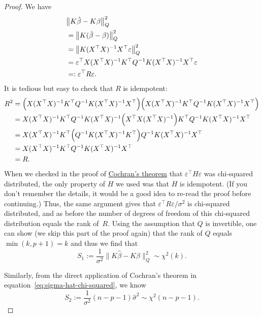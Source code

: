 \documentclass[
  a4paper,
]{article}
\theoremstyle{definition}
\theoremstyle{definition}
\theoremstyle{definition}
\theoremstyle{definition}
\theoremstyle{remark}
\begin{document}
\begin{proof}
We have
\begin{align*}
  \hskip-5mm
  & \bigl\| K \hat\beta - K \beta \bigr\|_Q^2 \\
  &= \bigl\| K (\hat\beta - \beta) \bigr\|_Q^2 \\
  &= \bigl\| K (X^\top X)^{-1} X^\top \varepsilon\bigr\|_Q^2 \\
  &= \varepsilon^\top X (X^\top X)^{-1} K^\top Q^{-1} K (X^\top X)^{-1} X^\top \varepsilon\\
  &=: \varepsilon^\top R \varepsilon.
\end{align*}
It is tedious but easy to check that \(R\) is idempotent:
\begin{align*}
  R^2
  &= \Bigl(X (X^\top X)^{-1} K^\top Q^{-1} K (X^\top X)^{-1} X^\top\Bigr)
     \Bigl(X (X^\top X)^{-1} K^\top Q^{-1} K (X^\top X)^{-1} X^\top\Bigr) \\
  &= X (X^\top X)^{-1} K^\top Q^{-1} K (X^\top X)^{-1} \Bigl(X^\top
     X (X^\top X)^{-1} \Bigr) K^\top Q^{-1} K (X^\top X)^{-1} X^\top \\
  &= X (X^\top X)^{-1} K^\top \Bigl( Q^{-1} K (X^\top X)^{-1} K^\top \Bigr)
      Q^{-1} K (X^\top X)^{-1} X^\top \\
  &= X (X^\top X)^{-1} K^\top Q^{-1} K (X^\top X)^{-1} X^\top \\
  &= R.
\end{align*}
When we checked in the proof of \hyperref[thm:Cochran]{Cochran's theorem} that
\(\varepsilon^\top H \varepsilon\) was chi-squared distributed, the only property of \(H\)
we used was that \(H\) is idempotent. (If you don't remember the details,
it would be a good idea to re-read the proof before continuing.) Thus,
the same argument gives that \(\varepsilon^\top R \varepsilon/ \sigma^2\) is chi-squared distributed,
and as before the number of degrees of freedom of this chi-squared distribution
equals the rank of~\(R\). Using the assumption that \(Q\) is invertible,
one can show (we skip this part of the proof again)
that the rank of \(Q\) equals \(\min(k, p+1) = k\) and thus we find that
\begin{equation*}
  S_1
  := \frac{1}{\sigma^2} \bigl\| K \hat\beta - K \beta \bigr\|_Q^2
  \sim \chi^2(k).
\end{equation*}

Similarly, from the direct application of Cochran's theorem in
equation~\eqref{eq:sigma-hat-chi-squared}, we know
\begin{equation*}
  S_2
  := \frac{1}{\sigma^2} (n - p - 1) \hat\sigma^2
  \sim \chi^2(n - p - 1).
\end{equation*}


\end{proof}
\end{document}
